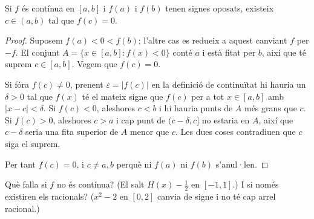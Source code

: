 %

\begin{frame}

\begin{theorem}[Bolzano]
Si $f$ és contínua en $[a, b]$ i $f(a)$ i $f(b)$ tenen signes oposats,
existeix $c \in (a, b)$ tal que $f(c) = 0$.
\end{theorem}


\begin{notesonly}
\begin{proof}
Suposem $f(a) < 0 < f(b)$; l'altre cas es redueix a aquest canviant $f$ per
$-f$. El conjunt $A = \{x \in [a, b] : f(x) < 0\}$ conté $a$ i està fitat
per $b$, així que té suprem $c \in [a, b]$. Vegem que $f(c) = 0$.

Si fóra $f(c) \neq 0$, prenent $\varepsilon = |f(c)|$ en la definició de
continuïtat hi hauria un $\delta > 0$ tal que $f(x)$ té el mateix signe que
$f(c)$ per a tot $x \in [a, b]$ amb $|x - c| < \delta$. Si $f(c) < 0$,
aleshores $c < b$ i hi hauria punts de $A$ més grans que $c$. Si $f(c) > 0$,
aleshores $c > a$ i cap punt de $(c - \delta, c]$ no estaria en $A$, així que
$c - \delta$ seria una fita superior de $A$ menor que $c$. Les dues coses
contradiuen que $c$ siga el suprem.

Per tant $f(c) = 0$, i $c \neq a, b$ perquè ni $f(a)$ ni $f(b)$ s'anul·len.
\end{proof}
\end{notesonly}

\begin{teaching}
Què falla si $f$ no és contínua? (El salt $H(x) - \tfrac12$ en $[-1, 1]$.)
I si només existiren els racionals? ($x^2 - 2$ en $[0, 2]$ canvia de signe i
no té cap arrel racional.)
\end{teaching}
\end{frame}

